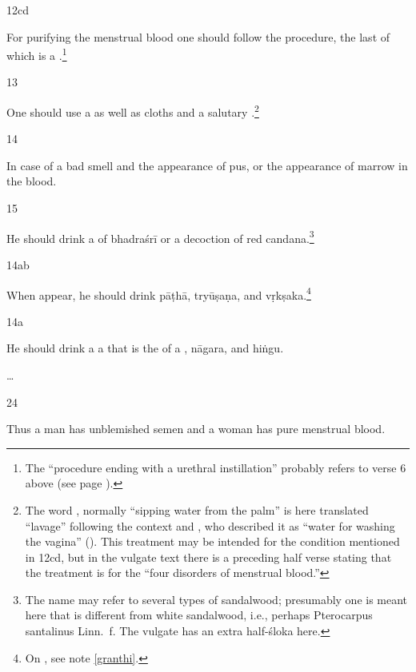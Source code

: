 \begin{translation}
\item [12cd]

For purifying the menstrual blood one should follow the procedure, the
last of which is a .\footnote{The
    “procedure ending with a urethral instillation” probably refers to verse
    6 above (see page \pageref{uttarabastyantam}).}
    
    
 \item[13]  
 
 One should use a  as well as cloths and a salutary
.\footnote{The word , normally
    “sipping water from the palm” is here translated “lavage” following the
    context and , who described it as “water for
    washing the vagina” ().  This treatment may be
    intended for the condition mentioned in 12cd, but in the vulgate text
    there is a preceding half verse stating that the treatment is for the
    “four disorders of menstrual blood.”}
    
\item[14]

In case of a bad smell and the appearance of pus, or the appearance of
marrow in the blood.
\item [15]

He should drink a  of \gls{bhadraśrī} or a decoction of 
red \gls{candana}.\footnote{The name  may refer to several 
types of sandalwood; presumably one is meant here that is different from 
white sandalwood, i.e., perhaps Pterocarpus santalinus Linn.\ f.  The vulgate 
has an extra half-śloka here.}
 
\item[14ab]
 
 When  appear, he should drink \gls{pāṭhā}, 
 \gls{tryūṣaṇa}, and \gls{vṛkṣaka}.\footnote{On , see note 
 \ref{granthi}.}
 
 \item[14a] 
 
 He should drink a a  that is the
 of  a , \gls{nāgara},
and \gls{hiṅgu}.
 
\item[\ldots] 
 
\item[24]

Thus a man has unblemished semen and a woman has pure menstrual blood. 
 

\end{translation}
